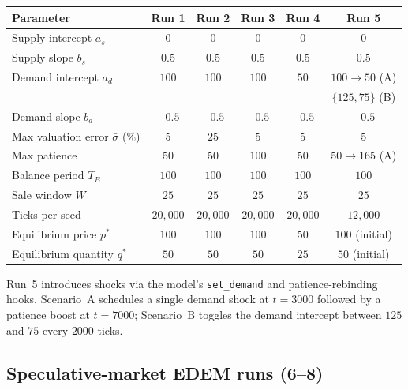 \begin{table}[h]
\centering
\small
\begin{tabular}{l c c c c c}
\toprule
\textbf{Parameter} & \textbf{Run 1} & \textbf{Run 2} & \textbf{Run 3} & \textbf{Run 4} & \textbf{Run 5} \\
\midrule
Supply intercept $a_{s}$    & $0$    & $0$    & $0$    & $0$    & $0$    \\
Supply slope $b_{s}$        & $0.5$  & $0.5$  & $0.5$  & $0.5$  & $0.5$  \\
Demand intercept $a_{d}$    & $100$  & $100$  & $100$  & $50$   & $100\!\to\!50$ (A) \\
                            &        &        &        &        & $\{125,75\}$ (B) \\
Demand slope $b_{d}$        & $-0.5$ & $-0.5$ & $-0.5$ & $-0.5$ & $-0.5$ \\
Max valuation error $\bar{\sigma}$ (\%)  & $5$   & $25$  & $5$   & $5$   & $5$   \\
Max patience               & $50$   & $50$   & $100$  & $50$   & $50\!\to\!165$ (A) \\
Balance period $T_{B}$     & $100$  & $100$  & $100$  & $100$  & $100$  \\
Sale window $W$            & $25$   & $25$   & $25$   & $25$   & $25$   \\
Ticks per seed             & $20{,}000$ & $20{,}000$ & $20{,}000$ & $20{,}000$ & $12{,}000$ \\
Equilibrium price $p^{*}$  & $100$  & $100$  & $100$  & $50$   & $100$ (initial) \\
Equilibrium quantity $q^{*}$ & $50$  & $50$   & $50$   & $25$   & $50$ (initial) \\
\bottomrule
\end{tabular}
\end{table}

Run~5 introduces shocks via the model's \texttt{set\_demand} and
patience-rebinding hooks. Scenario~A schedules a single demand shock
at $t = 3000$ followed by a patience boost at $t = 7000$;
Scenario~B toggles the demand intercept between $125$ and $75$ every
$2000$ ticks.

\subsection{Speculative-market EDEM runs (6--8)}

